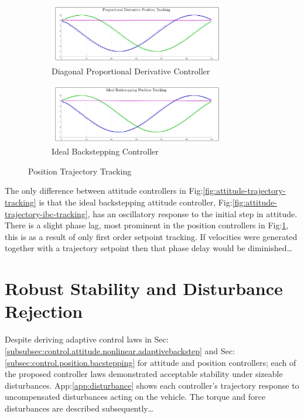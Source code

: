 \begin{figure}[hbtp]
\vspace{-40pt}
\begin{subfigure}{\textwidth}
\centering
\includegraphics[width=0.85\textwidth]{graphs/PD_Position_Trajectory}
\vspace{-6pt}
\caption{Diagonal Proportional Derivative Controller}
\end{subfigure}
\vspace{-6pt}
\begin{subfigure}{\textwidth}
\centering
\includegraphics[width=0.85\textwidth]{graphs/IBC_Position_Trajectory}
\vspace{-6pt}
\caption{Ideal Backstepping Controller}
\end{subfigure}
\caption{Position Trajectory Tracking}
\label{fig:position-trajectory-tracking}
\vspace{-24pt}
\end{figure}
\par
\vspace{14pt}
The only difference between attitude controllers in Fig:\ref{fig:attitude-trajectory-tracking} is that the ideal backstepping attitude controller, Fig:\ref{fig:attitude-trajectory-ibc-tracking}, has an oscillatory response to the initial step in attitude. There is a slight phase lag, most prominent in the position controllers in Fig:\ref{fig:position-trajectory-tracking}, this is as a result of only first order setpoint tracking. If velocities were generated together with a trajectory setpoint then that phase delay would be diminished\ldots
\newpage
\section{Robust Stability and Disturbance Rejection}
\label{sec:simulation.disturbnace}
Despite deriving adaptive control laws in Sec:\ref{subsubsec:control.attitude.nonlinear.adaptivebackstep} and Sec:\ref{subsec:control.position.bacstepping} for attitude and position controllers; each of the proposed controller laws demonstrated acceptable stability under sizeable disturbances. App:\ref{app:disturbance} shows each controller's trajectory response to uncompensated disturbances acting on the vehicle. The torque and force disturbances are described subsequently\ldots
